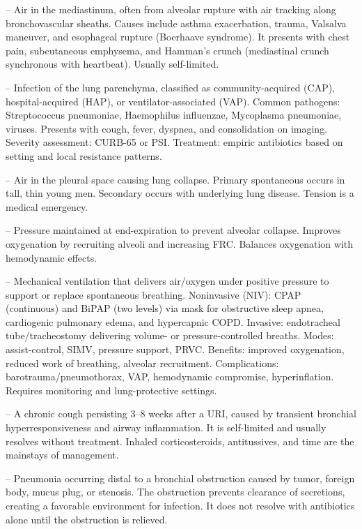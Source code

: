 -- Air in the mediastinum, often from alveolar rupture with air tracking along bronchovascular sheaths. Causes include asthma exacerbation, trauma, Valsalva maneuver, and esophageal rupture (Boerhaave syndrome). It presents with chest pain, subcutaneous emphysema, and Hamman's crunch (mediastinal crunch synchronous with heartbeat). Usually self-limited.

-- Infection of the lung parenchyma, classified as community-acquired (CAP), hospital-acquired (HAP), or ventilator-associated (VAP). Common pathogens: Streptococcus pneumoniae, Haemophilus influenzae, Mycoplasma pneumoniae, viruses. Presents with cough, fever, dyspnea, and consolidation on imaging. Severity assessment: CURB-65 or PSI. Treatment: empiric antibiotics based on setting and local resistance patterns.

-- Air in the pleural space causing lung collapse. Primary spontaneous occurs in tall, thin young men. Secondary occurs with underlying lung disease. Tension is a medical emergency.

-- Pressure maintained at end-expiration to prevent alveolar collapse. Improves oxygenation by recruiting alveoli and increasing FRC. Balances oxygenation with hemodynamic effects.

-- Mechanical ventilation that delivers air/oxygen under positive pressure to support or replace spontaneous breathing. Noninvasive (NIV): CPAP (continuous) and BiPAP (two levels) via mask for obstructive sleep apnea, cardiogenic pulmonary edema, and hypercapnic COPD. Invasive: endotracheal tube/tracheostomy delivering volume- or pressure-controlled breaths. Modes: assist-control, SIMV, pressure support, PRVC. Benefits: improved oxygenation, reduced work of breathing, alveolar recruitment. Complications: barotrauma/pneumothorax, VAP, hemodynamic compromise, hyperinflation. Requires monitoring and lung-protective settings.

-- A chronic cough persisting 3--8 weeks after a URI, caused by transient bronchial hyperresponsiveness and airway inflammation. It is self-limited and usually resolves without treatment. Inhaled corticosteroids, antitussives, and time are the mainstays of management.

-- Pneumonia occurring distal to a bronchial obstruction caused by tumor, foreign body, mucus plug, or stenosis. The obstruction prevents clearance of secretions, creating a favorable environment for infection. It does not resolve with antibiotics alone until the obstruction is relieved.


